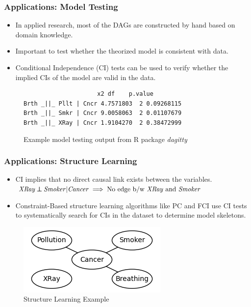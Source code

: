 \documentclass{beamer}
\def\ci{\perp\!\!\!\!\!\perp}
\begin{document}
\begin{frame}[fragile]
	\frametitle{Applications: Model Testing}
	\begin{itemize}
		\item In applied research, most of the DAGs are constructed by hand
			based on domain knowledge.
		\item Important to test whether the theorized model is consistent with data.
		\item Conditional Independence (CI) tests can be used to verify whether the implied
			CIs of the model are valid in the data.
	\end{itemize}

	\begin{figure}
		\centering
 		\begin{BVerbatim}
		             x2 df    p.value
Brth _||_ Pllt | Cncr 4.7571803  2 0.09268115
Brth _||_ Smkr | Cncr 9.0058063  2 0.01107679
Brth _||_ XRay | Cncr 1.9104270  2 0.38472999
 		\end{BVerbatim}
		\caption*{Example model testing output from R package \emph{dagitty}}
	\end{figure}
\end{frame}

\begin{frame}
	\frametitle{Applications: Structure Learning}
	\begin{itemize}
		\setlength\itemsep{1em}
		\item CI implies that no direct causal link exists between the variables. \newline
			$ \text{\emph{XRay}} \ci \text{\emph{Smoker}} | \text{\emph{Cancer}} \implies \text{No edge b/w \emph{XRay} and \emph{Smoker}} $

		\item Constraint-Based structure learning algorithms like PC
			and FCI use CI tests to systematically search for CIs
			in the dataset to determine model skeletons.
	\end{itemize}
	\begin{figure}
		\centering
		\includegraphics[scale=0.6]{imgs/example_sl.png}
		\caption*{Structure Learning Example}
	\end{figure}
\end{frame}
\end{document}
